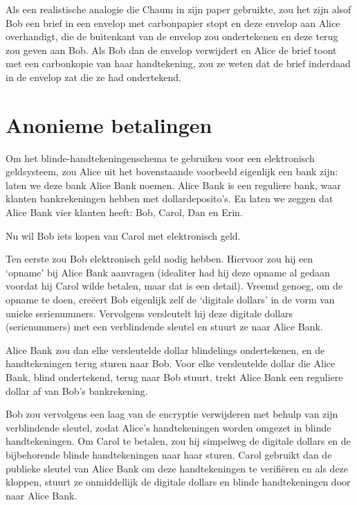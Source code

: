 \documentclass[
  a5paper,
  smalldemyvopaper,11pt,twoside,onecolumn,openright,extrafontsizes]{memoir}
\begin{document}
Als een realistische analogie die Chaum in zijn paper gebruikte, zou het
zijn alsof Bob een brief in een envelop met carbonpapier stopt en deze
envelop aan Alice overhandigt, die de buitenkant van de envelop zou
ondertekenen en deze terug zou geven aan Bob. Als Bob dan de envelop
verwijdert en Alice de brief toont met een carbonkopie van haar
handtekening, zou ze weten dat de brief inderdaad in de envelop zat die
ze had ondertekend.

\section{Anonieme betalingen}\label{anonieme-betalingen}

Om het blinde-handtekeningenschema te gebruiken voor een elektronisch
geldsysteem, zou Alice uit het bovenstaande voorbeeld eigenlijk een bank
zijn: laten we deze bank Alice Bank noemen. Alice Bank is een reguliere
bank, waar klanten bankrekeningen hebben met dollardeposito's. En laten
we zeggen dat Alice Bank vier klanten heeft: Bob, Carol, Dan en Erin.

Nu wil Bob iets kopen van Carol met elektronisch geld.

Ten eerste zou Bob elektronisch geld nodig hebben. Hiervoor zou hij een
`opname' bij Alice Bank aanvragen (idealiter had hij deze opname al
gedaan voordat hij Carol wilde betalen, maar dat is een detail). Vreemd
genoeg, om de opname te doen, creëert Bob eigenlijk zelf de `digitale
dollars' in de vorm van unieke serienummers. Vervolgens versleutelt hij
deze digitale dollars (serienummers) met een verblindende sleutel en
stuurt ze naar Alice Bank.

Alice Bank zou dan elke versleutelde dollar blindelings ondertekenen, en
de handtekeningen terug sturen naar Bob. Voor elke versleutelde dollar
die Alice Bank, blind ondertekend, terug naar Bob stuurt, trekt Alice
Bank een reguliere dollar af van Bob's bankrekening.

Bob zou vervolgens een laag van de encryptie verwijderen met behulp van
zijn verblindende sleutel, zodat Alice's handtekeningen worden omgezet
in blinde handtekeningen. Om Carol te betalen, zou hij simpelweg de
digitale dollars en de bijbehorende blinde handtekeningen naar haar
sturen. Carol gebruikt dan de publieke sleutel van Alice Bank om deze
handtekeningen te verifiëren en als deze kloppen, stuurt ze onmiddellijk
de digitale dollars en blinde handtekeningen door naar Alice Bank.
\end{document}
